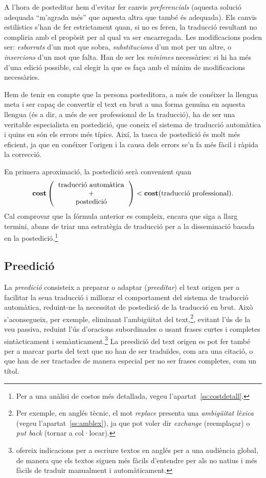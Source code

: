 A l'hora de posteditar hem d'evitar fer canvis \emph{preferencials}
(aquesta solució adequada ``m'agrada més'' que aquesta altra que també
és adequada). Els canvis estilístics s'han de fer estrictament quan,
si no es feren, la traducció resultant no compliria amb el propòsit
per al qual va ser encarregada.  Les modificacions poden ser:
\emph{esborrats} d'un mot que sobra, \emph{substitucions} d'un mot per
un altre, o \emph{insercions} d'un mot que falta. Han de ser les
\emph{mínimes} necessàries: si hi ha més d'una edició possible, cal
elegir la que es faça amb el mínim de modificacions necessàries.

Hem de tenir en compte que la persona posteditora, a més de conéixer
la llengua meta i ser capaç de convertir el text en brut a una forma
genuïna en aquesta llengua (és a dir, a més de ser professional de la
traducció), ha de ser una veritable especialista en postedició, que
coneix el sistema de traducció automàtica i quins en són els errors
més típics. Així, la tasca de postedició és molt més eficient, ja que
en conéixer l'origen i la causa dels errors se'n fa més fàcil i ràpida
la correcció.

En primera aproximació, la postedició serà convenient quan
$$\textbf{cost}\left(\mbox{\begin{tabular}{c}traducció automàtica\\ +\\
      postedició\end{tabular}}\right) <
\textbf{cost}(\mbox{traducció professional}).
$$
\label{pg:cost}
Cal comprovar que la fórmula anterior es compleix, encara que siga a
llarg termini, abans de triar una estratègia de traducció per a la
disseminació basada en la postedició.\footnote{Per a una anàlisi de
  costos més detallada, vegeu l'apartat~\ref{ss:costdetall}.}

\subsection{Preedició} 
\label{ss:preedicio}
La \emph{preedició} consisteix a preparar o adaptar (\emph{preeditar})
el text origen per a facilitar la seua traducció i millorar el
comportament del sistema de traducció automàtica, reduint-ne la
necessitat de postedició de la traducció en brut. Això s'aconsegueix,
per exemple, eliminant l'ambigüitat del text,\footnote{Per exemple, en
  anglés tècnic, el mot \emph{replace} presenta una \emph{ambigüitat
    lèxica} (vegeu l'apartat~\ref{ss:amblex}), ja que pot voler dir
  \emph{exchange} (reemplaçar) o \emph{put back} (tornar a
  col·locar).}, evitant l'ús de la veu passiva, reduint l'ús
d'oracions subordinades o usant frases curtes i completes sintàcticament i
semànticament.\footnote{\citet{kohl08} ofereix indicacions
  per a escriure textos en anglés per a una audiència global, de
  manera que els textos siguen més fàcils d'entendre per als no natius
  i més fàcils de traduir manualment i automàticament.} La preedició
del text origen es pot fer també per a marcar parts del text que no
han de ser traduïdes, com ara una citació, o que han de ser tractades
de manera especial per no ser frases completes, com un títol.


